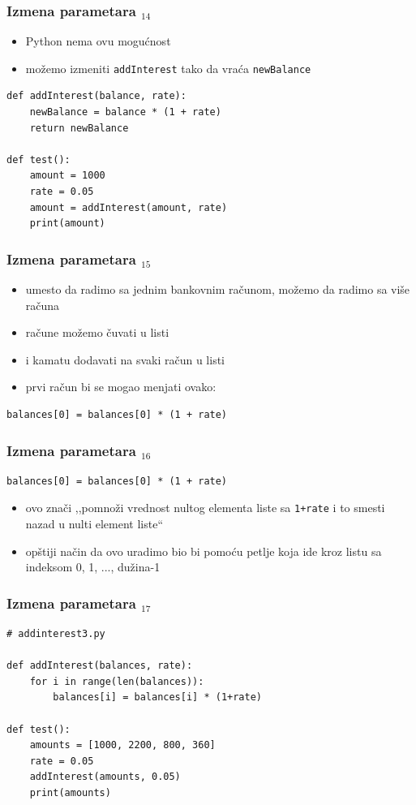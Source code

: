 \documentclass[utf8,compress]{beamer}
\begin{document}
\begin{frame}[fragile]
  \frametitle{Izmena parametara $_{14}$}
  \begin{itemize}
    \item Python nema ovu mogućnost
    \item možemo izmeniti \texttt{addInterest} tako da vraća \texttt{newBalance}
  \end{itemize}
\begin{verbatim}
def addInterest(balance, rate):
    newBalance = balance * (1 + rate)
    return newBalance

def test():
    amount = 1000
    rate = 0.05
    amount = addInterest(amount, rate)
    print(amount)
\end{verbatim}
\end{frame}

\begin{frame}[fragile]
  \frametitle{Izmena parametara $_{15}$}
  \begin{itemize}
    \item umesto da radimo sa jednim bankovnim računom, možemo da radimo sa više računa
    \item račune možemo čuvati u listi
    \item i kamatu dodavati na svaki račun u listi
    \item prvi račun bi se mogao menjati ovako:
  \end{itemize}
\begin{verbatim}
balances[0] = balances[0] * (1 + rate)
\end{verbatim}
\end{frame}

\begin{frame}[fragile]
  \frametitle{Izmena parametara $_{16}$}
\begin{verbatim}
balances[0] = balances[0] * (1 + rate)
\end{verbatim}
  \begin{itemize}
    \item ovo znači ,,pomnoži vrednost nultog elementa liste sa \texttt{1+rate} i to smesti nazad u nulti element liste``
    \item opštiji način da ovo uradimo bio bi pomoću petlje koja ide kroz listu sa indeksom 0, 1, ..., dužina-1
  \end{itemize}
\end{frame}

\begin{frame}[fragile]
  \frametitle{Izmena parametara $_{17}$}
\begin{verbatim}
# addinterest3.py

def addInterest(balances, rate):
    for i in range(len(balances)):
        balances[i] = balances[i] * (1+rate)

def test():
    amounts = [1000, 2200, 800, 360]
    rate = 0.05
    addInterest(amounts, 0.05)
    print(amounts)
\end{verbatim}
\end{frame}
\end{document}
